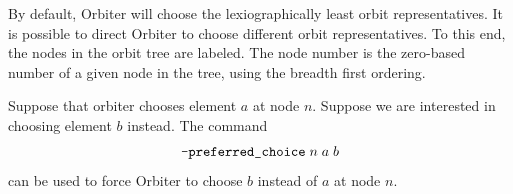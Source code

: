 By default, Orbiter will choose the lexiographically least orbit representatives. 
It is possible to direct Orbiter to choose different orbit representatives. 
To this end, the nodes in the orbit tree are labeled. 
The node number is the zero-based number of a given node in the tree, 
using the breadth first ordering. 

\bigskip


Suppose that orbiter chooses element $a$ at node $n.$ 
Suppose we are interested in choosing element $b$ instead. 
The command 
$$
\verb'-preferred_choice' \; n \; a \; b
$$
can be used to force Orbiter to choose $b$ instead of $a$ at node $n$.

